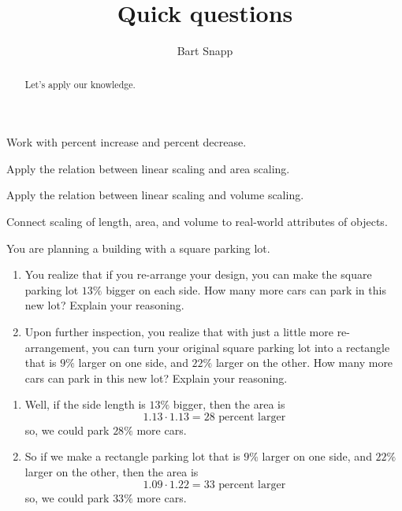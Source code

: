 \documentclass[nooutcomes,noauthor,handout]{ximera}
\title{Quick questions}
\author{Bart Snapp}
\begin{document}
\begin{abstract}
  Let's apply our knowledge.
\end{abstract}
\maketitle


\begin{listOutcomes}
\item Work with percent increase and percent decrease.
\item Apply the relation between linear scaling and area scaling.
\item Apply the relation between linear scaling and volume scaling.
\item Connect scaling of length, area, and volume to real-world
  attributes of objects.
\end{listOutcomes}

\mynewpage


\begin{question}
  You are planning a building with a square parking lot.
  \begin{enumerate}
  \item You realize that if you re-arrange your design, you can make
    the square parking lot $13\%$ bigger on each side. How many more
    cars can park in this new lot? Explain your reasoning.
  \item Upon further inspection, you realize that with just a little
    more re-arrangement, you can turn your original square parking lot
    into a rectangle that is $9\%$ larger on one side, and $22\%$
    larger on the other. How many more cars can park in this new lot?
    Explain your reasoning.
  \end{enumerate}
  \begin{freeResponse}
    \begin{enumerate}
    \item Well, if the side length is $13\%$ bigger, then the area is
      \[
      1.13\cdot 1.13 = \text{$28$ percent larger}
      \]
      so, we could park $28\%$ more cars.
    \item So if we make a rectangle parking lot that is $9\%$ larger on
      one side, and $22\%$ larger on the other, then the area is
      \[
      1.09\cdot 1.22 = \text{$33$ percent larger}
      \]
      so, we could park $33\%$ more cars.
    \end{enumerate}
  \end{freeResponse}
\end{question}
\mynewpage
\end{document}
